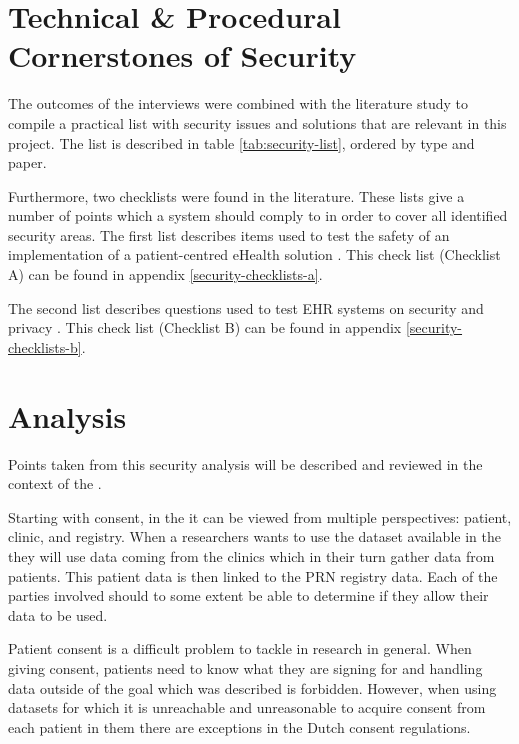 \section{Technical \& Procedural Cornerstones of Security}
\label{security-summarisation}

The outcomes of the interviews were combined with the literature study to compile a practical list with security issues and solutions that are relevant in this project.
The list is described in table \ref{tab:security-list}, ordered by type and paper.

Furthermore, two checklists were found in the literature.
These lists give a number of points which a system should comply to in order to cover all identified security areas.
The first list describes items used to test the safety of an implementation of a patient-centred eHealth solution \cite{s17Dehling2014}.
This check list (Checklist A) can be found in appendix \ref{security-checklists-a}.

The second list describes questions used to test EHR systems on security and privacy \cite{s8FernandezAleman2013}.
This check list (Checklist B) can be found in appendix \ref{security-checklists-b}.



\section{Analysis}
\label{security-summarisation-analysis}

Points taken from this security analysis will be described and reviewed in the context of the \ivfsystem{}.

Starting with consent, in the \project{} it can be viewed from multiple perspectives: patient, clinic, and registry.
When a researchers wants to use the dataset available in the \ivfsystem{} they will use data coming from the clinics which in their turn gather data from patients.
This patient data is then linked to the PRN registry data.
Each of the parties involved should to some extent be able to determine if they allow their data to be used.

Patient consent is a difficult problem to tackle in research in general.
When giving consent, patients need to know what they are signing for and handling data outside of the goal which was described is forbidden.
However, when using datasets for which it is unreachable and unreasonable to acquire consent from each patient in them there are exceptions in the Dutch consent regulations.

